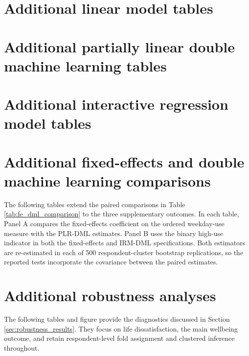 \documentclass[11pt,oneside,a4paper]{book}
\newcommand{\tocsection}[2]{%
  \section[#1]{#2}%
}
\begin{document}
\FloatBarrier
\tocsection{Additional Linear Model Tables}{Additional linear model tables}







\FloatBarrier
\tocsection{Additional Partially Linear Double Machine Learning Tables}{Additional partially linear double machine learning tables}







\FloatBarrier
\tocsection{Additional Interactive Regression Model Tables}{Additional interactive regression model tables}







\FloatBarrier
\tocsection{Additional Fixed-Effects and Double Machine Learning Comparisons}{Additional fixed-effects and double machine learning comparisons}

The following tables extend the paired comparisons in Table \ref{tab:fe_dml_comparison} to the three supplementary outcomes. In each table, Panel A compares the fixed-effects coefficient on the ordered weekday-use measure with the PLR-DML estimates. Panel B uses the binary high-use indicator in both the fixed-effects and IRM-DML specifications. Both estimators are re-estimated in each of 500 respondent-cluster bootstrap replications, so the reported tests incorporate the covariance between the paired estimates.







\FloatBarrier
\tocsection{Additional Robustness Analyses}{Additional robustness analyses}
\label{sec:additional_robustness}

The following tables and figure provide the diagnostics discussed in Section \ref{sec:robustness_results}. They focus on life dissatisfaction, the main wellbeing outcome, and retain respondent-level fold assignment and clustered inference throughout.
\end{document}
